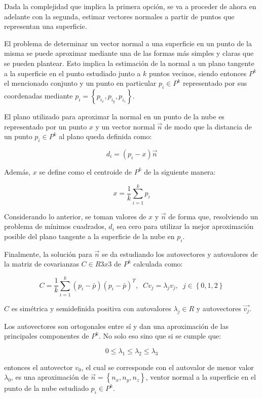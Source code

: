 Dada la complejidad que implica la primera opción, se va a proceder de ahora en adelante con la segunda, estimar vectores normales a partir de puntos que representan una superficie.

El problema de determinar un vector normal a una superficie en un punto de la misma se puede aproximar mediante una de las formas más simples y claras que se pueden plantear. Esto implica la estimación de la normal a un plano tangente a la superficie en el punto estudiado junto a $k$ puntos vecinos, siendo entonces $P^k$ el mencionado conjunto y un punto en particular $p_{i} \in P^{k}$ representado por sus coordenadas mediante $p_{i}=\left\lbrace p_{i_x},p_{i_y},p_{i_z} \right\rbrace$.

El plano utilizado para aproximar la normal en un punto de la nube es representado por un punto $x$ y un vector normal $\vec{n}$ de modo que la distancia de un punto $p_{i} \in P^{k}$ al plano queda definida como:

$$d_i=(p_{i}-x)\vec{n}$$

Además, $x$ se define como el centroide de $P^{k}$ de la siguiente manera:

$$x=\frac{1}{k}\sum_{i=1}^{k} p_i$$

Considerando lo anterior, se toman valores de $x$ y $\vec{n}$ de forma que, resolviendo un problema de mínimos cuadrados, $d_i$ sea cero para utilizar la mejor aproximación posible del plano tangente a la superficie de la nube en $p_i$.

Finalmente, la solución para $\vec{n}$ se da estudiando los autovectores y autovalores de la matriz de covarianzas $C \in R 3x3$ de $P^{k}$ calculada como:

$$C=\frac{1}{k}\sum_{i=1}^{k} (p_i-\bar{p})(p_i-\bar{p})^T,\;\;Cv_{j}=\lambda_ {j}v_{j},\;\;j \in \left\lbrace 0,1,2 \right\rbrace$$

$C$ es simétrica y semidefinida positiva con autovalores $\lambda_j \in R$ y autovectores $\vec{v_j}$.

Los autovectores son ortogonales entre sí y dan una aproximación de las principales componentes de $P^k$. No solo eso sino que si se cumple que:
 
 $$0\leq\lambda_1\leq\lambda_2\leq\lambda_3$$

entonces el autovector $v_0$, el cual se corresponde con el autovalor de menor valor $\lambda_0$, es una aproximación de $\vec{n}= \left\lbrace n_x,n_y,n_z\right\rbrace$, ventor normal a la superficie en el punto de la nube estudiado $p_i \in P^k$.


